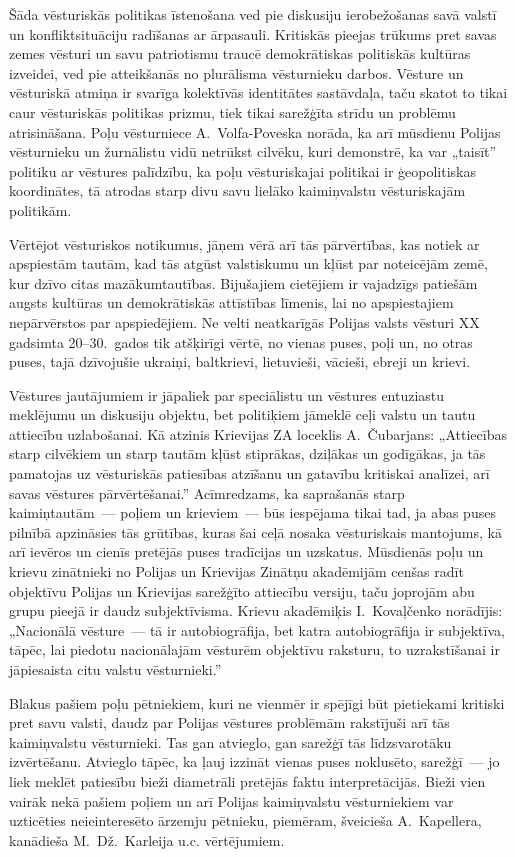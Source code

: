 \documentclass[twoside,a5paper,12pt,fleqn,openany]{extbook}
\begin{document}
Šāda vēsturiskās politikas īstenošana ved pie diskusiju ierobežošanas savā valstī un konfliktsituāciju radīšanas ar ārpasauli. Kritiskās pieejas trūkums pret savas zemes vēsturi un savu patriotismu traucē demokrātiskas politiskās kultūras izveidei, ved pie atteikšanās no plurālisma vēsturnieku darbos. Vēsture un vēsturiskā atmiņa ir svarīga kolektīvās identitātes sastāvdaļa, taču skatot to tikai caur vēsturiskās politikas prizmu, tiek tikai sarežģīta strīdu un problēmu atrisināšana. Poļu vēsturniece A.~Volfa-Poveska norāda, ka arī mūsdienu Polijas vēsturnieku un žurnālistu vidū netrūkst cilvēku, kuri demonstrē, ka var „taisīt” politiku ar vēstures palīdzību, ka poļu vēsturiskajai politikai ir ģeopolitiskas koordinātes, tā atrodas starp divu savu lielāko kaimiņvalstu vēsturiskajām politikām.

Vērtējot vēsturiskos notikumus, jāņem vērā arī tās pārvērtības, kas notiek ar apspiestām tautām, kad tās atgūst valstiskumu un kļūst par noteicējām zemē, kur dzīvo citas mazākumtautības. Bijušajiem cietējiem ir vajadzīgs patiešām augsts kultūras un demokrātiskās attīstības līmenis, lai no apspiestajiem nepārvērstos par apspiedējiem. Ne velti neatkarīgās Polijas valsts vēsturi XX gadsimta 20--30.~gados tik atšķirīgi vērtē, no vienas puses, poļi un, no otras puses, tajā dzīvojušie ukraiņi, baltkrievi, lietuvieši, vācieši, ebreji un krievi.

Vēstures jautājumiem ir jāpaliek par speciālistu un vēstures entuziastu meklējumu un diskusiju objektu, bet politiķiem jāmeklē ceļi valstu un tautu attiecību uzlabošanai. Kā atzinis Krievijas ZA loceklis A.~Čubarjans: „Attiecības starp cilvēkiem un starp tautām kļūst stiprākas, dziļākas un godīgākas, ja tās pamatojas uz vēsturiskās patiesības atzīšanu un gatavību kritiskai analīzei, arī savas vēstures pārvērtēšanai.” Acīmredzams, ka saprašanās starp kaimiņtautām~--- poļiem un krieviem~--- būs iespējama tikai tad, ja abas puses pilnībā apzināsies tās grūtības, kuras šai ceļā nosaka vēsturiskais mantojums, kā arī ievēros un cienīs pretējās puses tradīcijas un uzskatus. Mūsdienās poļu un krievu zinātnieki no Polijas un Krievijas Zinātņu akadēmijām cenšas radīt objektīvu Polijas un Krievijas sarežģīto attiecību versiju, taču joprojām abu grupu pieejā ir daudz subjektīvisma. Krievu akadēmiķis I.~Kovaļčenko norādījis: „Nacionālā vēsture~--- tā ir autobiogrāfija, bet katra autobiogrāfija ir subjektīva, tāpēc, lai piedotu nacionālajām vēsturēm objektīvu raksturu, to uzrakstīšanai ir jāpiesaista citu valstu vēsturnieki.”

Blakus pašiem poļu pētniekiem, kuri ne vienmēr ir spējīgi būt pietiekami kritiski pret savu valsti, daudz par Polijas vēstures problēmām rakstījuši arī tās kaimiņvalstu vēsturnieki. Tas gan atvieglo, gan sarežģī tās līdzsvarotāku izvērtēšanu. Atvieglo tāpēc, ka ļauj izzināt vienas puses noklusēto, sarežģī~--- jo liek meklēt patiesību bieži diametrāli pretējās faktu interpretācijās. Bieži vien vairāk nekā pašiem poļiem un arī Polijas kaimiņvalstu vēsturniekiem var uzticēties neieinteresēto ārzemju pētnieku, piemēram, šveicieša A.~Kapellera, kanādieša M.~Dž.~Karleija u.c. vērtējumiem.
\end{document}
